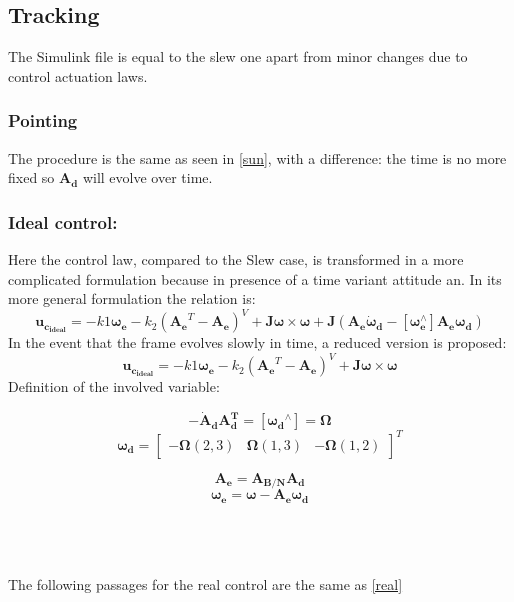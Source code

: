 \documentclass[11pt]{article}
\begin{document}
  \subsection{Tracking}
  The Simulink file is equal to the slew one apart from minor changes due to control actuation laws.
  \subsubsection{Pointing}
  The procedure is the same as seen in \ref{sun}, with a difference: the time is no more fixed so $\mathbf{A_d}$ will evolve over time.
  \subsubsection{Ideal control:}
    Here  the control law, compared to the Slew case, is transformed in a more complicated formulation because in presence of a time variant attitude an. In its more general formulation the relation  is:
    \begin{equation}
        \mathbf{u_{c_{ideal}}} =-k1\boldsymbol{\omega_e}-k_2(\mathbf{A_e}^T-\mathbf{A_e})^{V}+\boldsymbol{J\omega}\times\boldsymbol{\omega+J}(\boldsymbol{A_e\dot{\omega}_d-[\omega_e^{\wedge}] A_e\omega_d})
    \end{equation}
    In the event that  the frame evolves slowly in time, a reduced version is proposed:
     \begin{equation}
        \mathbf{u_{c_{ideal}}} =-k1\boldsymbol{\omega_e}-k_2(\mathbf{A_e}^T-\mathbf{A_e})^{V}+\boldsymbol{J\omega}\times\boldsymbol{\omega}
    \end{equation}
Definition of the involved variable:\\
\begin{minipage}{.5 \textwidth}
\begin{equation}
-\mathbf{\dot{A}_dA_d^T}  = [\boldsymbol{\omega_d}^{\wedge}]=\boldsymbol{\Omega}
\end{equation}
\begin{equation}
\boldsymbol{\omega_d}=\begin{bmatrix}
-\boldsymbol{\Omega}(2,3)& \boldsymbol{\Omega}(1,3) &-\boldsymbol{\Omega}(1,2)
\end{bmatrix}^T
\end{equation}
\end{minipage}
\begin{minipage}{.5 \textwidth}
\begin{equation}
      \mathbf{A_e}=\mathbf{A_{B/N}}\mathbf{A_d}
\end{equation}
\begin{equation}
    \boldsymbol{\omega_e}=\boldsymbol{\omega}-\mathbf{A_e}\boldsymbol{\omega_d}
\end{equation}

\end{minipage}\\\\\\
The following passages for the real control are the same as \ref{real}
\clearpage
\end{document}
